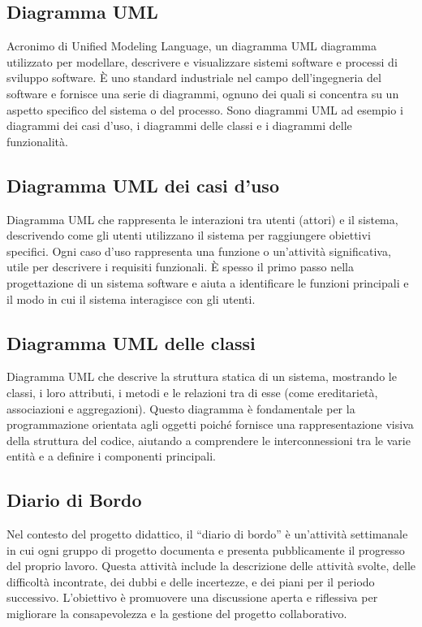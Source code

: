 \hypertarget{sec:diagramma_UML}{}
\subsection*{Diagramma UML}
Acronimo di Unified Modeling Language, un diagramma UML diagramma utilizzato per modellare, descrivere e visualizzare sistemi software e processi di sviluppo 
software. È uno standard industriale nel campo dell’ingegneria del software e fornisce una serie di diagrammi, ognuno dei quali si concentra su un aspetto 
specifico del sistema o del processo. Sono diagrammi UML ad esempio i diagrammi dei casi d’uso, i diagrammi delle classi e i diagrammi delle funzionalità.

\subsection*{Diagramma UML dei casi d'uso}
Diagramma UML che rappresenta le interazioni tra utenti (attori) e il sistema, descrivendo come gli utenti utilizzano il sistema per raggiungere obiettivi 
specifici. Ogni caso d'uso rappresenta una funzione o un'attività significativa, utile per descrivere i requisiti funzionali. È spesso il primo passo nella 
progettazione di un sistema software e aiuta a identificare le funzioni principali e il modo in cui il sistema interagisce con gli utenti.

\subsection*{Diagramma UML delle classi}
Diagramma UML che descrive la struttura statica di un sistema, mostrando le classi, i loro attributi, i metodi e le relazioni tra di esse (come ereditarietà, 
associazioni e aggregazioni). Questo diagramma è fondamentale per la programmazione orientata agli oggetti poiché fornisce una rappresentazione visiva della 
struttura del codice, aiutando a comprendere le interconnessioni tra le varie entità e a definire i componenti principali.

\hypertarget{sec:diario_di_bordo}{}
\subsection*{Diario di Bordo}
Nel contesto del progetto didattico, il “diario di bordo” è un’attività settimanale in cui ogni gruppo di progetto documenta e presenta pubblicamente il progresso del proprio lavoro. 
Questa attività include la descrizione delle attività svolte, delle difficoltà incontrate, dei dubbi e delle incertezze, e dei piani per il periodo successivo. 
L’obiettivo è promuovere una discussione aperta e riflessiva per migliorare la consapevolezza e la gestione del progetto collaborativo.

